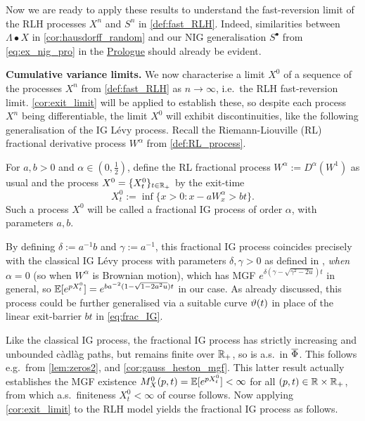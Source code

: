 Now we are ready to apply these results to understand the fast-reversion limit of the RLH processes $X^n$ and $S^n$ in \autoref{def:fast_RLH}. Indeed, similarities between $\Lambda\bullet X$ in \autoref{cor:hausdorff_random} and our NIG generalisation $S^\bullet$ from \autoref{eq:ex_nig_pro} in the \hyperlink{prologue}{Prologue} should already be evident.

\vspace{3mm}\textbf{Cumulative variance limits.} We now characterise a limit $X^0$ of a sequence of the processes $X^n$ from \autoref{def:fast_RLH} as $n\to\infty$, i.e.~the RLH fast-reversion limit. \autoref{cor:exit_limit} will be applied to establish these, so despite each process $X^n$ being differentiable, the limit $X^0$ will exhibit discontinuities, like the following generalisation of the IG L\'evy process. Recall the Riemann-Liouville (RL) fractional derivative process $W^\alpha$ from \autoref{def:RL_process}.

\begin{definition}\label{def:frac_IG}
    For $a,b>0$ and $\alpha\in(0,\frac12)$, define the RL fractional process $W^\alpha:=D^\alpha(W^1)$ as usual and the process $X^0=\{X^0_t\}_{t\in\mathbb{R}_+}$ by the exit-time~
    \begin{equation}\label{eq:frac_IG}
        X^0_t :=\inf\big\{x>0 : x - a W^\alpha_x > bt\big\}.
    \end{equation}
    Such a process $X^0$ will be called a fractional IG process of order $\alpha$, with parameters $a,b$.
\end{definition}

By defining $\delta:=a^{-1}b$ and $\gamma:=a^{-1}$, this fractional IG process coincides precisely with the classical IG L\'evy process with parameters $\delta,\gamma>0$ as defined in \cite{applebaum_2009}, \emph{when} $\alpha=0$ (so when $W^\alpha$ is Brownian motion), which has MGF $e^{\delta(\gamma-\sqrt{\gamma^2-2u})t}$ in general, so $\mathbb{E}[e^{pX^0_t}] = e^{ba^{-2}(1-\sqrt{1-2a^2u})t}$ in our case. As already discussed, this process could be further generalised via a suitable curve $\vartheta(t)$ in place of the linear exit-barrier $bt$ in \autoref{eq:frac_IG}.

Like the classical IG process, the fractional IG process has strictly increasing and unbounded c\`adl\`ag paths, but remains finite over $\mathbb{R}_+$, so is a.s.~in $\overline{\Phi}$. This follows e.g.~from \autoref{lem:zeros2}, and \autoref{cor:gauss_heston_mgf}. This latter result actually establishes the MGF existence $M^0_X(p,t)=\mathbb{E}[e^{pX^0_t}]<\infty$ for all $(p,t)\in\mathbb{R}\times\mathbb{R}_+$, from which a.s.~finiteness $X^0_t<\infty$ of course follows. Now applying \autoref{cor:exit_limit} to the RLH model yields the fractional IG process as follows.

